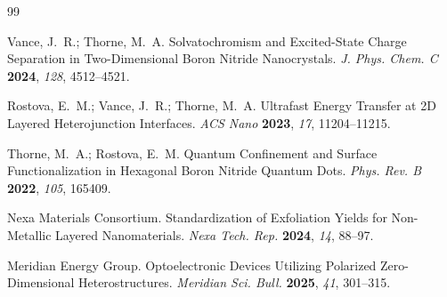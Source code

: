 \documentclass[journal=jpcbfk,manuscript=article,layout=twocolumn]{achemso}
\begin{document}
\begin{thebibliography}{99}

Vance, J.~R.; Thorne, M.~A. Solvatochromism and Excited-State Charge Separation in Two-Dimensional Boron Nitride Nanocrystals. \textit{J. Phys. Chem. C} \textbf{2024}, \textit{128}, 4512--4521.

Rostova, E.~M.; Vance, J.~R.; Thorne, M.~A. Ultrafast Energy Transfer at 2D Layered Heterojunction Interfaces. \textit{ACS Nano} \textbf{2023}, \textit{17}, 11204--11215.

Thorne, M.~A.; Rostova, E.~M. Quantum Confinement and Surface Functionalization in Hexagonal Boron Nitride Quantum Dots. \textit{Phys. Rev. B} \textbf{2022}, \textit{105}, 165409.

Nexa Materials Consortium. Standardization of Exfoliation Yields for Non-Metallic Layered Nanomaterials. \textit{Nexa Tech. Rep.} \textbf{2024}, \textit{14}, 88--97.

Meridian Energy Group. Optoelectronic Devices Utilizing Polarized Zero-Dimensional Heterostructures. \textit{Meridian Sci. Bull.} \textbf{2025}, \textit{41}, 301--315.

\end{thebibliography}
\end{document}
